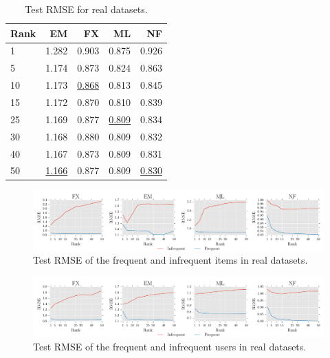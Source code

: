 \begin{table}[hbt]
\caption{Test RMSE for real datasets.}
\label{param_test_rmse}
  \begin{center}
    \begin{tabular}{lrrrr}
      Rank & EM & FX & ML & NF \\
      \hline
      1 & 1.282 & 0.903 & 0.875 & 0.926 \\
      5 & 1.174 & 0.873 & 0.824 & 0.863 \\
     10 & 1.173 & \underline{0.868} & 0.813 & 0.845 \\
      15 & 1.172 & 0.870 & 0.810 & 0.839 \\
      25 & 1.169 & 0.877 & \underline{0.809} & 0.834 \\
      30 & 1.168 & 0.880 & 0.809 & 0.832 \\
      40 & 1.167 & 0.873 & 0.809 & 0.831 \\
      50 & \underline{1.166} & 0.877 & 0.809 & \underline{0.830} \\
    \end{tabular}
  \end{center}
\end{table}

\begin{figure}[hbt]
  \includegraphics[scale=0.5]{figures/infreq_freq_RMSES.pdf} 
  \caption{Test RMSE of the frequent and infrequent items in real datasets.}
  \label{fig:freq_inFreq_rmse}
\end{figure}


\begin{figure}[hbt]
  \includegraphics[scale=0.5]{figures/infreq_freq_user_RMSES.pdf} 
  \caption{Test RMSE of the frequent and infrequent users in real datasets.}
  \label{fig:freq_inFreq_user_rmse}
\end{figure}

